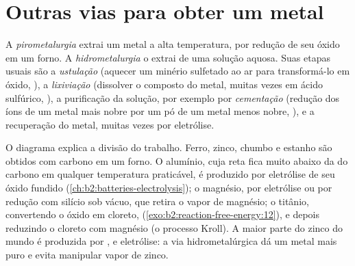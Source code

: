 \section{Outras vias para obter um metal}

\begin{definition}\label{def:b2:ellingham:metallurgy}
A \emph{pirometalurgia} extrai um metal a alta
temperatura, por redução de seu óxido em um forno. A \emph{hidrometalurgia}
o extrai de uma solução aquosa. Suas etapas usuais são a
\emph{ustulação} (aquecer um minério sulfetado ao ar para
transformá-lo em óxido, ), a \emph{lixiviação}
(dissolver o composto do metal, muitas vezes em ácido sulfúrico, ), a purificação da solução, por exemplo por
\emph{cementação} (redução dos íons de um metal mais nobre
por um pó de um metal menos nobre, ), e a
recuperação do metal, muitas vezes por eletrólise.
\end{definition}

O diagrama explica a divisão do trabalho. Ferro, zinco, chumbo e estanho são
obtidos com carbono em um forno. O alumínio, cuja reta fica muito abaixo da
do carbono em qualquer temperatura praticável, é produzido por eletrólise de
seu óxido fundido (\cref{ch:b2:batteries-electrolysis}); o magnésio, por
eletrólise ou por redução com silício sob vácuo, que retira o vapor de
magnésio; o titânio, convertendo o óxido em cloreto,  (\cref{exo:b2:reaction-free-energy:12}), e depois reduzindo o cloreto com
magnésio (o processo Kroll). A maior parte do zinco do mundo é produzida por
,  e eletrólise: a via hidrometalúrgica dá um metal mais
puro e evita manipular vapor de zinco.


